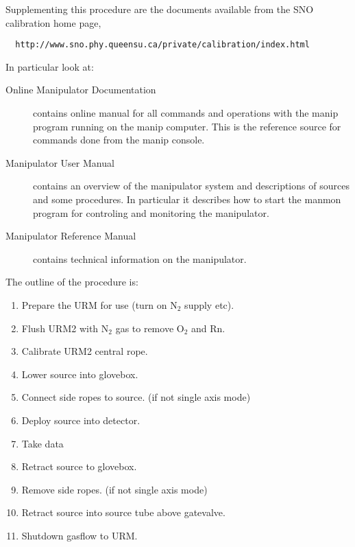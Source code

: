   Supplementing this procedure are the documents available
from the SNO calibration home page,
\begin{verbatim}
  http://www.sno.phy.queensu.ca/private/calibration/index.html
\end{verbatim}
In particular look at:
\begin{description}
\item[Online Manipulator Documentation] contains online manual
  for all commands and operations with the manip program running
  on the manip computer.  This is the reference source for commands
  done from the manip console.
\item[Manipulator User Manual] contains an overview of the manipulator
  system and descriptions of sources and some procedures.  In particular
  it describes how to start the manmon program for controling and monitoring
  the manipulator.
\item[Manipulator Reference Manual] contains technical information on
  the manipulator.
\end{description}

\noindent
  The outline of the procedure is:
\begin{enumerate}
\item Prepare the URM for use (turn on N$_2$ supply etc).
\item Flush URM2 with N$_2$ gas to remove O$_2$ and Rn.
\item Calibrate URM2 central rope.
\item Lower source into glovebox.
\item Connect side ropes to source. (if not single axis mode)
\item Deploy source into detector.
\item Take data
\item Retract source to glovebox.
\item Remove side ropes. (if not single axis mode)
 \item Retract source into source tube above gatevalve.
\item Shutdown gasflow to  URM.
\end{enumerate}






\newpage
